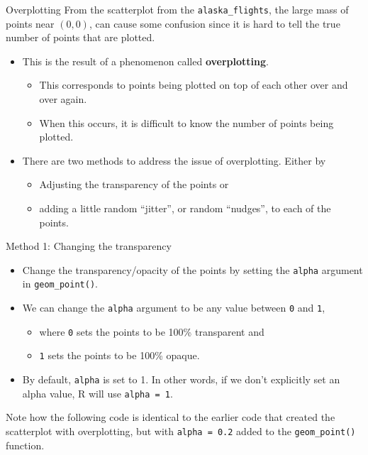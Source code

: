 \documentclass[
  ignorenonframetext,
]{beamer}
\providecommand{\tightlist}{%
  \setlength{\itemsep}{0pt}\setlength{\parskip}{0pt}}
\begin{document}
\begin{frame}[fragile]{Overplotting}
\protect\hypertarget{overplotting}{}
From the scatterplot from the \texttt{alaska\_flights}, the large mass
of points near \((0, 0)\), can cause some confusion since it is hard to
tell the true number of points that are plotted.

\begin{itemize}
\item
  This is the result of a phenomenon called \textbf{overplotting}.

  \begin{itemize}
  \tightlist
  \item
    This corresponds to points being plotted on top of each other over
    and over again.
  \item
    When this occurs, it is difficult to know the number of points being
    plotted.
  \end{itemize}
\item
  There are two methods to address the issue of overplotting. Either by

  \begin{itemize}
  \tightlist
  \item
    Adjusting the transparency of the points or
  \item
    adding a little random ``jitter'', or random ``nudges'', to each of
    the points.
  \end{itemize}
\end{itemize}
\end{frame}

\begin{frame}[fragile]{Method 1: Changing the transparency}
\protect\hypertarget{method-1-changing-the-transparency}{}
\begin{itemize}
\item
  Change the transparency/opacity of the points by setting the
  \texttt{alpha} argument in \texttt{geom\_point()}.
\item
  We can change the \texttt{alpha} argument to be any value between
  \texttt{0} and \texttt{1},

  \begin{itemize}
  \tightlist
  \item
    where \texttt{0} sets the points to be 100\% transparent and
  \item
    \texttt{1} sets the points to be 100\% opaque.
  \end{itemize}
\item
  By default, \texttt{alpha} is set to 1. In other words, if we don't
  explicitly set an alpha value, R will use \texttt{alpha\ =\ 1}.
\end{itemize}

Note how the following code is identical to the earlier code that
created the scatterplot with overplotting, but with
\texttt{alpha\ =\ 0.2} added to the \texttt{geom\_point()} function.
\end{frame}
\end{document}
